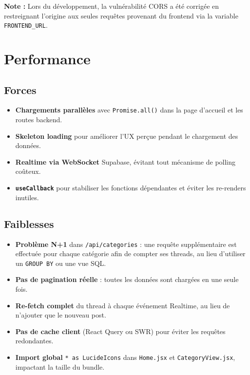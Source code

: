 \documentclass[12pt, a4paper]{report}
\begin{document}
\textbf{Note :} Lors du développement, la vulnérabilité CORS a été corrigée en restreignant l'origine aux seules requêtes provenant du frontend via la variable \texttt{FRONTEND\_URL}.

\section{Performance}

\subsection{Forces}

\begin{itemize}
    \item \textbf{Chargements parallèles} avec \texttt{Promise.all()} dans la page d'accueil et les routes backend.
    \item \textbf{Skeleton loading} pour améliorer l'UX perçue pendant le chargement des données.
    \item \textbf{Realtime via WebSocket} Supabase, évitant tout mécanisme de polling coûteux.
    \item \textbf{\texttt{useCallback}} pour stabiliser les fonctions dépendantes et éviter les re-renders inutiles.
\end{itemize}

\subsection{Faiblesses}

\begin{itemize}
    \item \textbf{Problème N+1} dans \texttt{/api/categories} : une requête supplémentaire est effectuée pour chaque catégorie afin de compter ses threads, au lieu d'utiliser un \texttt{GROUP BY} ou une vue SQL.
    \item \textbf{Pas de pagination réelle} : toutes les données sont chargées en une seule fois.
    \item \textbf{Re-fetch complet} du thread à chaque événement Realtime, au lieu de n'ajouter que le nouveau post.
    \item \textbf{Pas de cache client} (React Query ou SWR) pour éviter les requêtes redondantes.
    \item \textbf{Import global} \texttt{* as LucideIcons} dans \texttt{Home.jsx} et \texttt{CategoryView.jsx}, impactant la taille du bundle.
\end{itemize}
\end{document}
